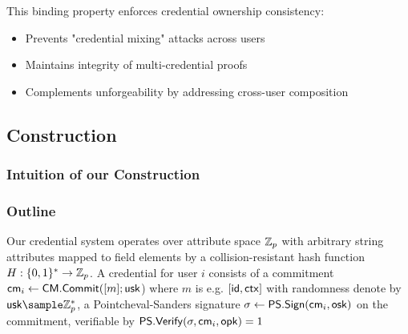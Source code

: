 \begin{remark}
This binding property enforces credential ownership consistency:
\begin{itemize}
    \item Prevents "credential mixing" attacks across users
    \item Maintains integrity of multi-credential proofs
    \item Complements unforgeability by addressing cross-user composition
\end{itemize}
\end{remark}























\newpage
\subsection{Construction}\label{sec:mimcabc-construction}
\subsubsection{Intuition of our Construction}




\subsubsection{Outline}
Our credential system operates over attribute space $\mathbb{Z}_p$ with arbitrary string attributes mapped to field elements by a collision-resistant hash function $H: \{0,1\}^* \to \mathbb{Z}_p$. A credential for user $i$ consists of a 
commitment $\mathsf{cm}_i \gets \mathsf{CM.Commit}([m]; \mathsf{usk}$) where $m$ is e.g. $[\mathsf{id}, \mathsf{ctx}]$ with randomness denote by $\usk \sample \Z_p^*$, a Pointcheval-Sanders signature $\sigma \gets \mathsf{PS.Sign}(\mathsf{cm}_i, \mathsf{osk})$ on the commitment, verifiable by $\mathsf{PS.Verify}(\sigma, \mathsf{cm}_i, \mathsf{opk}) = 1$


